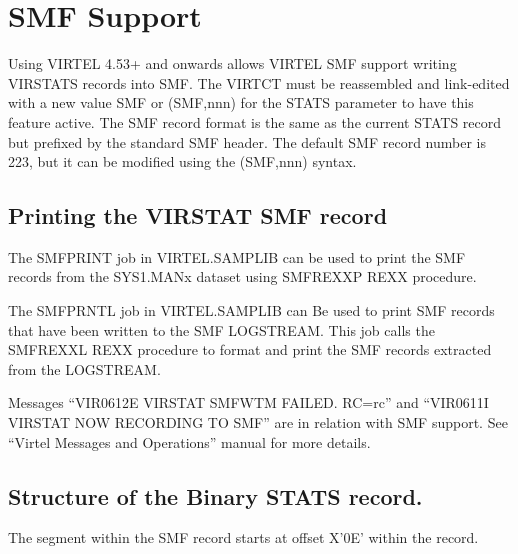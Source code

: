 \documentclass[letterpaper,10pt,english]{sphinxmanual}
\begin{document}
\ignorespaces 

\section{SMF Support}
\label{\detokenize{audit_operations_ and_performance:smf-support}}\label{\detokenize{audit_operations_ and_performance:index-90}}
Using VIRTEL 4.53+ and onwards allows VIRTEL SMF support writing VIRSTATS records into SMF. The VIRTCT must be reassembled and link-edited with a new value SMF or (SMF,nnn) for the STATS parameter to have this feature active. The SMF record format is the same as the current STATS record but prefixed by the standard SMF header. The default SMF record number is 223, but it can be modified using the (SMF,nnn) syntax.

\ignorespaces 

\subsection{Printing the VIRSTAT SMF record}
\label{\detokenize{audit_operations_ and_performance:printing-the-virstat-smf-record}}\label{\detokenize{audit_operations_ and_performance:index-91}}
The SMFPRINT job in VIRTEL.SAMPLIB can be used to print the SMF records from the SYS1.MANx dataset using SMFREXXP REXX procedure.

The SMFPRNTL job in VIRTEL.SAMPLIB can Be used to print SMF records that have been written to the SMF LOGSTREAM. This job calls the SMFREXXL REXX procedure to format and print the SMF records extracted from the LOGSTREAM.

Messages “VIR0612E VIRSTAT SMFWTM FAILED. RC=rc” and “VIR0611I VIRSTAT NOW RECORDING TO SMF” are in relation with SMF support. See “Virtel Messages and Operations” manual for more details.


\subsection{Structure of the Binary STATS record.}
\label{\detokenize{audit_operations_ and_performance:structure-of-the-binary-stats-record}}
The segment within the SMF record starts at offset X’0E’ within the record.
\end{document}
